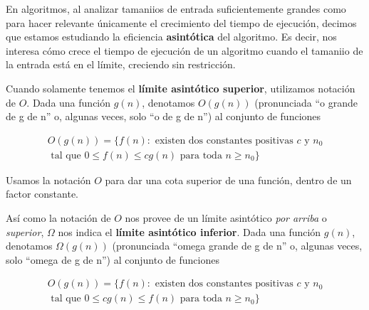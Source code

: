 En algoritmos, al analizar tamaniios de entrada suficientemente grandes como para hacer relevante \'unicamente el crecimiento del tiempo de ejecuci\'on, decimos que estamos estudiando la eficiencia \textbf{asint\'otica} del algoritmo. Es decir, nos interesa c\'omo crece el tiempo de ejecuci\'on de un algoritmo cuando el tamaniio de la entrada est\'a en el l\'imite, creciendo sin restricci\'on.

\begin{definition}[Notaci\'on $O$]
Cuando solamente tenemos el \textbf{l\'imite asint\'otico superior}, utilizamos notaci\'on de $O$. Dada una funci\'on $g(n)$, denotamos $O(g(n))$ (pronunciada ``o grande de g de n'' o, algunas veces, solo ``o de g de n'') al conjunto de funciones
\end{definition}

\begin{equation*}
\begin{split}
O(g(n)) = \{f(n): \text{ existen dos constantes positivas } c \text{ y } n_0 \\
\text{ tal que } 0 \leq f(n) \leq cg(n) \text{ para toda } n \geq n_0\}
\end{split}
\end{equation*}

Usamos la notaci\'on $O$ para dar una cota superior de una funci\'on, dentro de un factor constante.

\begin{definition}

As\'i como la notaci\'on de $O$ nos provee de un l\'imite asint\'otico \textit{por arriba} o \textit{superior}, $\Omega$ nos indica el \textbf{l\'imite asint\'otico inferior}. Dada una funci\'on $g(n)$, denotamos $\Omega(g(n))$ (pronunciada ``omega grande de g de n'' o, algunas veces, solo ``omega de g de n'') al conjunto de funciones
\end{definition}

\begin{equation*}
\begin{split}
O(g(n)) = \{f(n): \text{ existen dos constantes positivas } c \text{ y } n_0 \\ \text{ tal que } 0 \leq cg(n) \leq f(n) \text{ para toda } n \geq n_0\}
\end{split}
\end{equation*}

